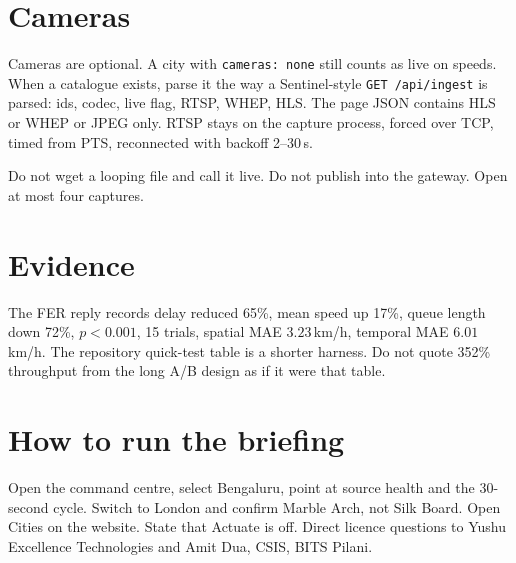 \documentclass[listings]{csf301-notes}
\begin{document}
\section{Cameras}
Cameras are optional. A city with \texttt{cameras: none} still counts as
live on speeds. When a catalogue exists, parse it the way a Sentinel-style
\texttt{GET /api/ingest} is parsed: ids, codec, live flag, RTSP, WHEP, HLS.
The page JSON contains HLS or WHEP or JPEG only. RTSP stays on the capture
process, forced over TCP, timed from PTS, reconnected with backoff 2--30\,s.

\begin{warning}
Do not wget a looping file and call it live. Do not publish into the
gateway. Open at most four captures.
\end{warning}

\section{Evidence}
The FER reply records delay reduced 65\%, mean speed up 17\%, queue length
down 72\%, $p<0.001$, 15 trials, spatial MAE $3.23$\,km/h, temporal MAE
$6.01$\,km/h. The repository quick-test table is a shorter harness. Do not
quote 352\% throughput from the long A/B design as if it were that table.

\section{How to run the briefing}
Open the command centre, select Bengaluru, point at source health and the
30-second cycle. Switch to London and confirm Marble Arch, not Silk Board.
Open Cities on the website. State that Actuate is off. Direct licence
questions to Yushu Excellence Technologies and Amit Dua, CSIS, BITS Pilani.
\end{document}
